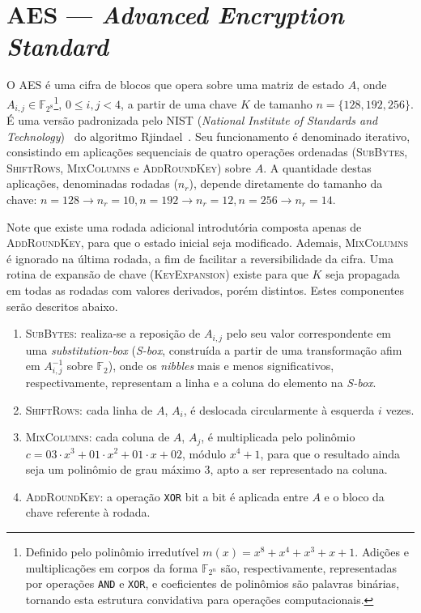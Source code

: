 \documentclass{article}
\begin{document}
\section{AES --- \emph{Advanced Encryption Standard}}

O AES é uma cifra de blocos que opera sobre uma matriz de estado $A$, onde $A_{i,j} \in \mathbb{F}_{2^{8}}$\footnote{Definido pelo polinômio irredutível $m(x) = x^{8} + x^{4} + x^{3} + x + 1$. Adições e multiplicações em corpos da forma $\mathbb{F}_{2^n}$ são, respectivamente, representadas por operações \texttt{AND} e \texttt{XOR}, e coeficientes de polinômios são palavras binárias, tornando esta estrutura convidativa para operações computacionais.}, $0 \leq i, j < 4$, a partir de uma chave $K$ de tamanho $n = \{128, 192, 256\}$. É uma versão padronizada pelo NIST (\emph{National Institute of Standards and Technology})~\cite{Standards2001} do algoritmo Rjindael~\cite{Daemen:2002:DR:560131}. Seu funcionamento é denominado iterativo, consistindo em aplicações sequenciais de quatro operações ordenadas (\textsc{SubBytes}, \textsc{ShiftRows}, \textsc{MixColumns} e \textsc{AddRoundKey}) sobre $A$. A quantidade destas aplicações, denominadas rodadas ($n_r$), depende diretamente do tamanho da chave: $n = 128 \rightarrow n_r = 10, n = 192 \rightarrow n_r = 12, n = 256 \rightarrow n_r = 14$.

Note que existe uma rodada adicional introdutória composta apenas de \textsc{AddRoundKey}, para que o estado inicial seja modificado. Ademais, \textsc{MixColumns} é ignorado na última rodada, a fim de facilitar a reversibilidade da cifra. Uma rotina de expansão de chave (\textsc{KeyExpansion}) existe para que $K$ seja propagada em todas as rodadas com valores derivados, porém distintos. Estes componentes serão descritos abaixo.

\begin{enumerate}[label=\roman*.]

    \item \textsc{SubBytes}: realiza-se a reposição de $A_{i,j}$
        pelo seu valor correspondente em uma \emph{substitution-box} (\emph{S-box}, construída a partir de uma transformação afim em $A_{i,j}^{-1}$ sobre $\mathbb{F}_2$), onde os \emph{nibbles} mais e menos significativos, respectivamente, representam a linha e a coluna do elemento na \emph{S-box}.

    \item \textsc{ShiftRows}: cada linha de $A$, $A_i$,
        é deslocada circularmente à esquerda $i$ vezes.

    \item \textsc{MixColumns}: cada coluna de $A$, $A_j$, é multiplicada pelo polinômio
        $c = 03 \cdot x^{3} + 01 \cdot x^{2} + 01 \cdot x + 02$, módulo $x^{4} + 1$, para que o resultado ainda seja um polinômio de grau máximo 3, apto a ser representado na coluna.

    \item \textsc{AddRoundKey}: a operação \texttt{XOR} bit a bit é aplicada entre $A$ e o
        bloco da chave referente à rodada.

\end{enumerate}
\end{document}
